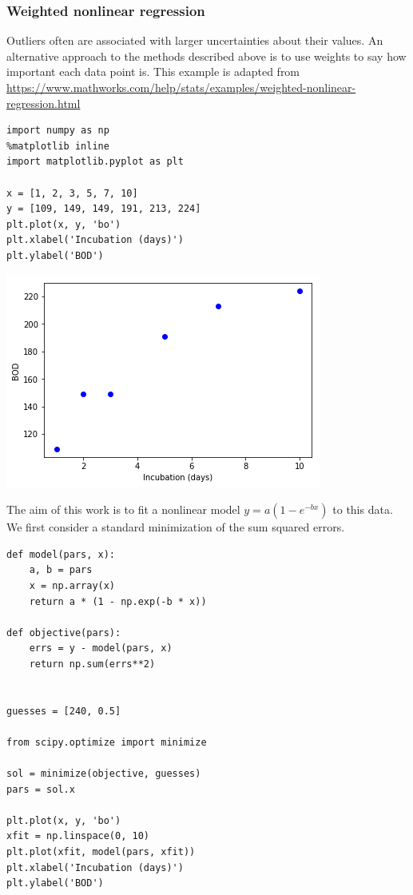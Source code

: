 \documentclass[11pt]{article}
\begin{document}
\subsubsection{Weighted nonlinear regression}
\label{sec:orgfbf5cff}

Outliers often are associated with larger uncertainties about their values. An alternative approach to the methods described above is to use weights to say how important each data point is. This example is adapted from \url{https://www.mathworks.com/help/stats/examples/weighted-nonlinear-regression.html}

\begin{verbatim}
import numpy as np
%matplotlib inline
import matplotlib.pyplot as plt

x = [1, 2, 3, 5, 7, 10]
y = [109, 149, 149, 191, 213, 224]
plt.plot(x, y, 'bo')
plt.xlabel('Incubation (days)')
plt.ylabel('BOD')
\end{verbatim}

\begin{center}
\includegraphics[width=.9\linewidth]{obipy-resources/37c51028cef42d76546d882661b04271-20264NNW.png}
\end{center}

The aim of this work is to fit a nonlinear model \(y= a (1 - e^{-b x})\) to this data. We first consider a standard minimization of the sum squared errors.

\begin{verbatim}
def model(pars, x):
    a, b = pars
    x = np.array(x)
    return a * (1 - np.exp(-b * x))

def objective(pars):
    errs = y - model(pars, x)
    return np.sum(errs**2)


guesses = [240, 0.5]

from scipy.optimize import minimize

sol = minimize(objective, guesses)
pars = sol.x

plt.plot(x, y, 'bo')
xfit = np.linspace(0, 10)
plt.plot(xfit, model(pars, xfit))
plt.xlabel('Incubation (days)')
plt.ylabel('BOD')
\end{verbatim}
\end{document}
